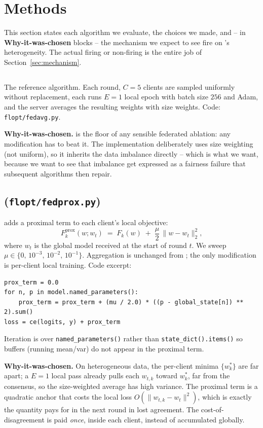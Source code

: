 \section{Methods}
\label{sec:methods}

This section states each algorithm we evaluate, the choices we made, and -- in
\textbf{Why-it-was-chosen} blocks -- the mechanism we expect to see fire on
\mimic{}'s heterogeneity. The actual firing or non-firing is the entire job
of Section~\ref{sec:mechanism}.

\subsection{\fedavg{}}
The reference algorithm. Each round, $C \!=\! 5$ clients are sampled uniformly
without replacement, each runs $E \!=\! 1$ local epoch with batch size $256$ and
Adam, and the server averages the resulting weights with size weights. Code:
\texttt{flopt/fedavg.py}.

\textbf{Why-it-was-chosen.} \fedavg{} is the floor of any sensible federated
ablation: any modification has to beat it. The implementation deliberately uses
size weighting (not uniform), so it inherits the data imbalance directly --
which is what we want, because we want to see that imbalance get expressed as
a fairness failure that subsequent algorithms then repair.

\subsection{\fedprox{} (\texttt{flopt/fedprox.py})}
\fedprox{} adds a proximal term to each client's local objective:
\[
F_k^{\mathrm{prox}}(w; w_t) \;=\; F_k(w) \;+\; \frac{\mu}{2}\, \|w - w_t\|_2^2,
\]
where $w_t$ is the global model received at the start of round $t$. We sweep
$\mu \in \{0,\,10^{-3},\,10^{-2},\,10^{-1}\}$. Aggregation is unchanged from
\fedavg{}; the only modification is per-client local training. Code excerpt:
\begin{lstlisting}
prox_term = 0.0
for n, p in model.named_parameters():
    prox_term = prox_term + (mu / 2.0) * ((p - global_state[n]) ** 2).sum()
loss = ce(logits, y) + prox_term
\end{lstlisting}
Iteration is over \texttt{named\_parameters()} rather than
\texttt{state\_dict().items()} so buffers (running mean/var) do not appear in
the proximal term.

\textbf{Why-it-was-chosen.} On heterogeneous data, the per-client minima
$\{w_k^*\}$ are far apart; a $E\!=\!1$ local pass already pulls each $w_{t,k}$
toward $w_k^*$, far from the consensus, so the size-weighted average has high
variance. The proximal term is a quadratic anchor that costs the local loss
$O(\|w_{t,k} - w_t\|^2)$, which is exactly the quantity \fedavg{} pays for in
the next round in lost agreement. The cost-of-disagreement is paid \emph{once},
inside each client, instead of accumulated globally.

